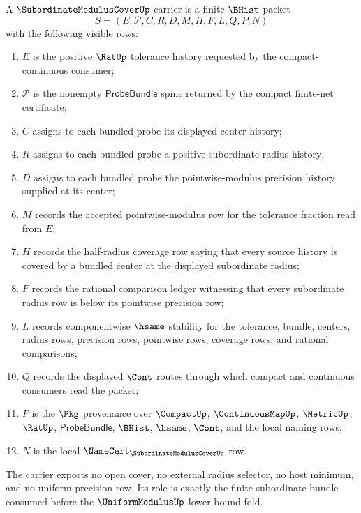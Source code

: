 \begin{definition}
\label{def:subordinate-modulus-cover-carrier}
A $\SubordinateModulusCoverUp$ carrier is a finite $\BHist$ packet
$$
S=(E,\mathcal{P},C,R,D,M,H,F,L,Q,P,N)
$$
with the following visible rows:
\begin{enumerate}
\item $E$ is the positive $\RatUp$ tolerance history requested by the compact-continuous consumer;
\item $\mathcal{P}$ is the nonempty $\mathsf{ProbeBundle}$ spine returned by the compact finite-net certificate;
\item $C$ assigns to each bundled probe its displayed center history;
\item $R$ assigns to each bundled probe a positive subordinate radius history;
\item $D$ assigns to each bundled probe the pointwise-modulus precision history supplied at its center;
\item $M$ records the accepted pointwise-modulus row for the tolerance fraction read from $E$;
\item $H$ records the half-radius coverage row saying that every source history is covered by a bundled center at the displayed subordinate radius;
\item $F$ records the rational comparison ledger witnessing that every subordinate radius row is below its pointwise precision row;
\item $L$ records componentwise $\hsame$ stability for the tolerance, bundle, centers, radius rows, precision rows, pointwise rows, coverage rows, and rational comparisons;
\item $Q$ records the displayed $\Cont$ routes through which compact and continuous consumers read the packet;
\item $P$ is the $\Pkg$ provenance over $\CompactUp$, $\ContinuousMapUp$, $\MetricUp$, $\RatUp$, $\mathsf{ProbeBundle}$, $\BHist$, $\hsame$, $\Cont$, and the local naming rows;
\item $N$ is the local $\NameCert_{\SubordinateModulusCoverUp}$ row.
\end{enumerate}
The carrier exports no open cover, no external radius selector, no host minimum, and no uniform precision row. Its role is exactly the finite subordinate bundle consumed before the $\UniformModulusUp$ lower-bound fold.
\end{definition}

